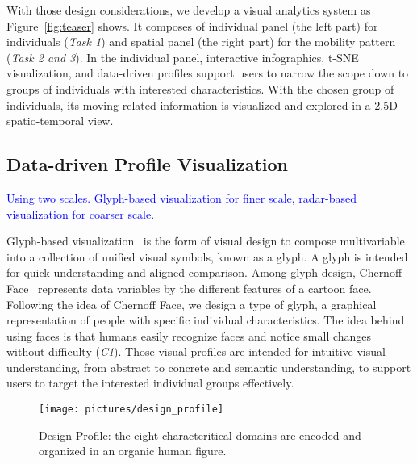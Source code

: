 With those design considerations, we develop a visual analytics system as Figure~\ref{fig:teaser} shows. It composes of individual panel (the left part) for individuals (\textit{Task 1}) and spatial panel (the right part) for the mobility pattern (\textit{Task 2 and 3}). In the individual panel, interactive infographics, t-SNE visualization, and data-driven profiles support users to narrow the scope down to groups of individuals with interested characteristics. With the chosen group of individuals, its moving related information is visualized and explored in a 2.5D spatio-temporal view.



\subsection{Data-driven Profile Visualization}
\textcolor{blue}{Using two scales. Glyph-based visualization for finer scale, radar-based visualization for coarser scale.}

Glyph-based visualization~\citep{borgo2013glyph} is the form of visual design to compose multivariable into a collection of unified visual symbols, known as a glyph. A glyph is intended for quick understanding and aligned comparison. Among glyph design, Chernoff Face~\citep{chernoff1973use} represents data variables by the different features of a cartoon face. Following the idea of Chernoff Face, we design a type of glyph, a graphical representation of people with specific individual characteristics. The idea behind using faces is that humans easily recognize faces and notice small changes without difficulty (\textit{C1}). Those visual profiles are intended for intuitive visual understanding, from abstract to concrete and semantic understanding, to support users to target the interested individual groups effectively.

\begin{figure}[htb!]
 \centering %
 \texttt{[image: pictures/design\_profile]}
 \caption{Design Profile: the eight characteritical domains are encoded and organized in an organic human figure.}
 \label{fig:design_profile}
\end{figure}

